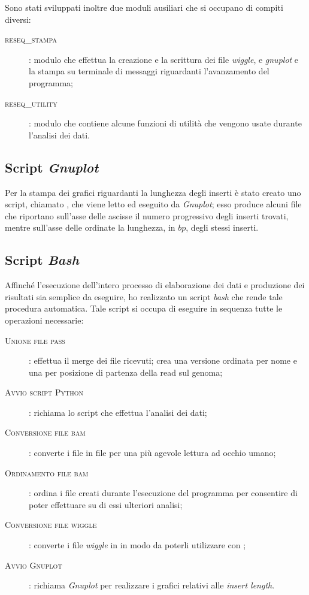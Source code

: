 Sono stati sviluppati inoltre due moduli ausiliari che si occupano di compiti diversi:
\begin{description}
\item[\textsc{reseq\_stampa}]: modulo che effettua la creazione e la scrittura dei file \emph{wiggle},  e \emph{gnuplot} e la stampa su terminale di messaggi riguardanti l'avanzamento del programma;

\item[\textsc{reseq\_utility}]: modulo che contiene alcune funzioni di utilità che vengono usate durante l'analisi dei dati.
\end{description}

\subsection{Script \emph{Gnuplot}}
Per la stampa dei grafici riguardanti la lunghezza degli inserti è stato creato uno script, chiamato , che viene letto ed eseguito da \emph{Gnuplot}; esso produce alcuni file  che riportano sull'asse delle ascisse il numero progressivo degli inserti trovati, mentre sull'asse delle ordinate la lunghezza, in $bp$, degli stessi inserti.

\subsection{Script \emph{Bash}}
\label{sec:bash}
Affinché l'esecuzione dell'intero processo di elaborazione dei dati e produzione dei risultati sia semplice da eseguire, ho realizzato un script \emph{bash} che rende tale procedura automatica.
Tale script si occupa di eseguire in sequenza tutte le operazioni necessarie:

\begin{description}
\item[\textsc{Unione file pass}]: effettua il merge dei file  ricevuti; crea una versione ordinata per nome e una per posizione di partenza della read sul genoma;
\item[\textsc{Avvio script Python}]: richiama lo script  che effettua l'analisi dei dati;
\item[\textsc{Conversione file bam}]: converte i file  in file  per una più agevole lettura ad occhio umano;
\item[\textsc{Ordinamento file bam}]: ordina i file  creati durante l'esecuzione del programma per consentire di poter effettuare su di essi ulteriori analisi;
\item[\textsc{Conversione file wiggle}]: converte i file \emph{wiggle} in  in modo da poterli utilizzare con ;
\item[\textsc{Avvio Gnuplot}]: richiama \emph{Gnuplot} per realizzare i grafici relativi alle \emph{insert length}.
\end{description}



